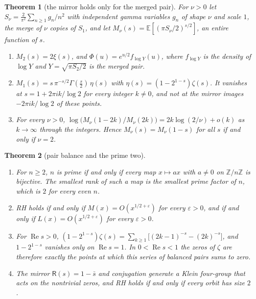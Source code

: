 \documentclass[11pt]{article}
\newtheorem{theorem}{Theorem}[section]
\theoremstyle{definition}\newtheorem{definition}[theorem]{Definition}
\theoremstyle{remark}\newtheorem{remark}[theorem]{Remark}
\renewcommand{\Re}{\operatorname{Re}}\renewcommand{\Im}{\operatorname{Im}}
\begin{document}
\begin{theorem}[the mirror holds only for the merged pair]\label{mt:nu}
For $\nu>0$ let $S_\nu=\frac2{\pi^2}\sum_{n\ge1}g_n/n^2$ with independent gamma variables $g_n$ of shape $\nu$ and scale $1$, the merge of $\nu$ copies of $S_1$, and let $M_\nu(s)=\mathbb E[(\pi S_\nu/2)^{s/2}]$, an entire function of $s$.
\begin{enumerate}[label=(\roman*)]
\item $M_2(s)=2\xi(s)$, and $\Phi(u)=e^{u/2}f_{\log Y}(u)$, where $f_{\log Y}$ is the density of $\log Y$ and $Y=\sqrt{\pi S_2/2}$ is the merged pair.
\item $M_1(s)=s\,\pi^{-s/2}\Gamma(\frac s2)\,\eta(s)$ with $\eta(s)=(1-2^{1-s})\zeta(s)$. It vanishes at $s=1+2\pi ik/\log2$ for every integer $k\ne0$, and not at the mirror images $-2\pi ik/\log2$ of these points.
\item For every $\nu>0$, $\log\bigl(M_\nu(1-2k)/M_\nu(2k)\bigr)=2k\log(2/\nu)+o(k)$ as $k\to\infty$ through the integers. Hence $M_\nu(s)=M_\nu(1-s)$ for all $s$ if and only if $\nu=2$.
\end{enumerate}
\end{theorem}

\begin{theorem}[pair balance and the prime two]\label{mt:prime2}
\begin{enumerate}[label=(\roman*)]
\item For $n\ge2$, $n$ is prime if and only if every map $x\mapsto ax$ with $a\ne0$ on $\mathbb Z/n\mathbb Z$ is bijective. The smallest rank of such a map is the smallest prime factor of $n$, which is $2$ for every even $n$.
\item RH holds if and only if $M(x)=O(x^{1/2+\varepsilon})$ for every $\varepsilon>0$, and if and only if $L(x)=O(x^{1/2+\varepsilon})$ for every $\varepsilon>0$.
\item For $\Re s>0$, $(1-2^{1-s})\zeta(s)=\sum_{k\ge1}\bigl[(2k-1)^{-s}-(2k)^{-s}\bigr]$, and $1-2^{1-s}$ vanishes only on $\Re s=1$. In $0<\Re s<1$ the zeros of $\zeta$ are therefore exactly the points at which this series of balanced pairs sums to zero.
\item The mirror $\mathsf R(s)=1-\bar s$ and conjugation generate a Klein four-group that acts on the nontrivial zeros, and RH holds if and only if every orbit has size $2$.
\end{enumerate}
\end{theorem}
\end{document}
